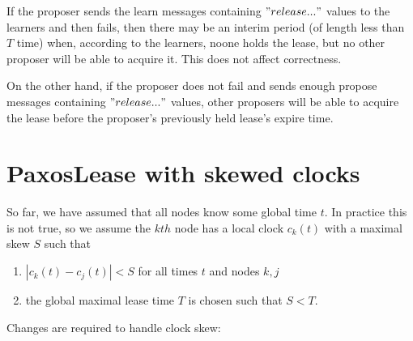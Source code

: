 \documentclass[12pt]{article}
\begin{document}
If the proposer sends the learn messages containing $"release..."$ values to the learners and then fails, then there may be an interim period (of length less than $T$ time) when, according to the learners, noone holds the lease, but no other proposer will be able to acquire it. This does not affect correctness.

On the other hand, if the proposer does not fail and sends enough propose messages containing $"release..."$ values, other proposers will be able to acquire the lease before the proposer's previously held lease's expire time.

\section{ PaxosLease with skewed clocks }

So far, we have assumed that all nodes know some global time $t$. In practice this is not true, so we assume the $kth$ node has a local clock $c_k(t)$ with a maximal skew $S$ such that

\begin{enumerate}

\item $|c_k(t) - c_j(t)| < S$ for all times $t$ and nodes $k, j$

\item the global maximal lease time $T$ is chosen such that $S < T$.

\end{enumerate}

Changes are required to handle clock skew:
\end{document}

